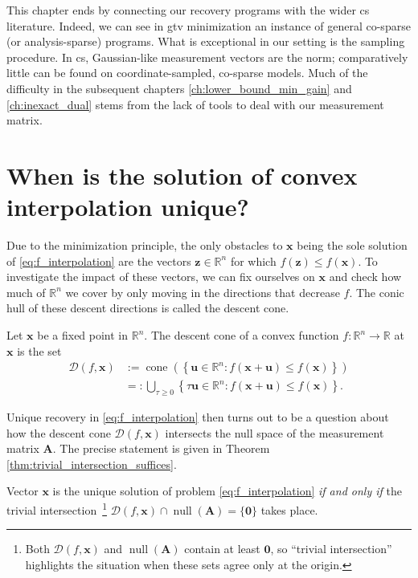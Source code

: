 This chapter ends by connecting our recovery programs with the wider \acrlong{cs} literature. Indeed, we can see in \acrshort{gtv} minimization an instance of general co-sparse (or analysis-sparse) programs. What is exceptional in our setting is the sampling procedure. In \acrshort{cs}, Gaussian-like measurement vectors are the norm; comparatively little can be found on coordinate-sampled, co-sparse models. Much of the difficulty in the subsequent chapters \ref{ch:lower_bound_min_gain} and \ref{ch:inexact_dual} stems from the lack of tools to deal with our measurement matrix.


\section{When is the solution of convex interpolation unique?}

Due to the minimization principle, the only obstacles to $\mathbf{x}$ being the sole solution of \eqref{eq:f_interpolation} are the vectors $\mathbf{z} \in \mathbb{R}^{n}$ for which $f(\mathbf{z}) \leq f(\mathbf{x})$. To investigate the impact of these vectors, we can fix ourselves on $\mathbf{x}$ and check how much of $\mathbb{R}^{n}$ we cover by only moving in the directions that decrease $f$. The conic hull of these descent directions is called the descent cone.

\begin{definition}
    Let $\mathbf{x}$ be a fixed point in $\mathbb{R}^{n}$. The descent cone of a convex function $f: \mathbb{R}^{n} \to \mathbb{R}$ at $\mathbf{x}$ is the set
    \begin{align}
        \mathcal{D}(f, \mathbf{x}) & := \operatorname{cone} \left ( \left\{ \mathbf{u} \in \mathbb{R}^{n} : f(\mathbf{x} + \mathbf{u}) \leq f(\mathbf{x}) \right\} \right ) \\
        & =: \bigcup_{\tau \geq 0} \left\{ \tau \mathbf{u} \in \mathbb{R}^{n} : f(\mathbf{x} + \mathbf{u}) \leq f(\mathbf{x}) \right\} .
    \end{align}
\end{definition}

Unique recovery in \eqref{eq:f_interpolation} then turns out to be a question about how the descent cone $\mathcal{D}(f, \mathbf{x})$ intersects the null space of the measurement matrix $\mathbf{A}$. The precise statement is given in Theorem \ref{thm:trivial_intersection_suffices}.

\begin{theorem}\label{thm:trivial_intersection_suffices}
    Vector $\mathbf{x}$ is the unique solution of problem \eqref{eq:f_interpolation} \emph{if and only if} the trivial intersection~\footnote{Both $\mathcal{D}(f, \mathbf{x})$ and $\operatorname{null} \left ( \mathbf{A} \right )$ contain at least $\mathbf{0}$, so ``trivial intersection'' highlights the situation when these sets agree only at the origin.} $\mathcal{D}(f, \mathbf{x}) \cap \operatorname{null} \left ( \mathbf{A} \right ) = \{ \mathbf{0} \}$ takes place.
\end{theorem}

